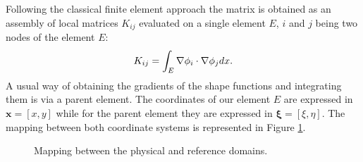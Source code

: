 \documentclass{article}
\theoremstyle{remark}
\def \d {{\rm d}}
\begin{document}
Following the classical finite element approach the matrix is obtained as an assembly of local matrices $K_{ij}$ evaluated on a single element $E$, $i$ and $j$ being two nodes of the element $E$:
\[
  K_{ij}
  = \int_E \nabla \phi_i \cdot \nabla \phi_j \d x. \nonumber
\]
A usual way of obtaining the gradients of the shape functions and integrating them is via a parent element. The coordinates of our element $E$ are expressed in $\mathbf{x} = [x,y]$ while for the parent element they are expressed in $\boldsymbol{\xi} = [\xi, \eta]$. The mapping between both coordinate systems  is represented in Figure \ref{fig:mapping}.
\begin{figure}[!ht]
\begin{center}
\end{center}
\caption{Mapping between the physical and reference domains.} \label{fig:mapping}
\end{figure}
\end{document}
